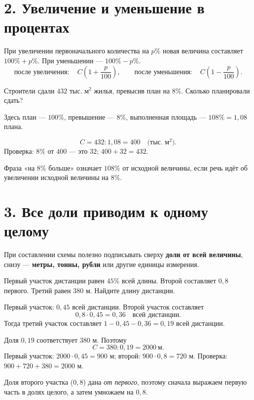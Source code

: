 \documentclass[a4paper,11pt]{article}
\newcommand{\mysection}[2]{\section*{\color{darkaccent}#1. #2}\vspace{-3pt}{\color{accent}\hrule height 0.55pt}\vspace{7pt}}
\newcommand{\ex}[1]{\par\medskip{\color{darkaccent}\bfseries Пример.} #1\par\smallskip}
\newcommand{\note}[1]{\par\smallskip{\color{accent}\bfseries Важно.} #1\par\smallskip}
\begin{document}
\mysection{2}{Увеличение и уменьшение в процентах}
При увеличении первоначального количества на $p\%$ новая величина составляет $100\%+p\%$. При уменьшении --- $100\%-p\%$.
\[
\text{после увеличения}:\quad C\left(1+\frac p{100}\right),\qquad
\text{после уменьшения}:\quad C\left(1-\frac p{100}\right).
\]
\ex{Строители сдали $432$ тыс. м$^2$ жилья, превысив план на $8\%$. Сколько планировали сдать?}
Здесь план --- $100\%$, превышение --- $8\%$, выполненная площадь --- $108\%=1{,}08$ плана.
\begin{center}
\end{center}
\[
C=432:1{,}08=400\quad\text{(тыс. м$^2$)}.
\]
Проверка: $8\%$ от $400$ --- это $32$; $400+32=432$.
\note{Фраза «на $8\%$ больше» означает $108\%$ от исходной величины, если речь идёт об увеличении исходной величины на $8\%$.}

\clearpage
\mysection{3}{Все доли приводим к одному целому}
При составлении схемы полезно подписывать сверху \textbf{доли от всей величины}, снизу --- \textbf{метры, тонны, рубли} или другие единицы измерения.

\ex{Первый участок дистанции равен $45\%$ всей длины. Второй составляет $0{,}8$ первого. Третий равен $380$ м. Найдите длину дистанции.}
Первый участок: $0{,}45$ всей дистанции. Второй участок составляет
\[
0{,}8\cdot0{,}45=0{,}36\quad\text{всей дистанции}.
\]
Тогда третий участок составляет $1-0{,}45-0{,}36=0{,}19$ всей дистанции.
\begin{center}
\end{center}
Доля $0{,}19$ соответствует $380$ м. Поэтому
\[
C=380:0{,}19=2000\ \text{м}.
\]
Первый участок: $2000\cdot0{,}45=900$ м; второй: $900\cdot0{,}8=720$ м.
Проверка: $900+720+380=2000$ м.
\note{Доля второго участка ($0{,}8$) дана \emph{от первого}, поэтому сначала выражаем первую часть в долях целого, а затем умножаем на $0{,}8$.}
\end{document}
